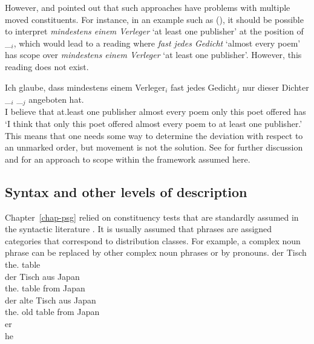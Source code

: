 \noindent
However, \citet[]{Kiss2001a} and \citet[Section~2.6]{Fanselow2001a} pointed out that such
approaches have problems with multiple moved constituents. For instance, in an example such as
(), it should be possible to interpret \emph{mindestens einem Verleger} `at least one
publisher' at the position of \_$_i$, which would lead to a reading where \emph{fast jedes Gedicht}
`almost every poem' has scope over \emph{mindestens einem Verleger} `at least one
publisher'. However, this reading does not exist.


\ea
\gll Ich glaube, dass mindestens einem Verleger$_i$ fast jedes Gedicht$_j$ nur dieser Dichter \_$_i$ \_$_j$ angeboten hat.\\
     I believe that at.least one publisher almost every poem only this poet {} {} offered has\\
\glt `I think that only this poet offered almost every poem to at least one publisher.'
\z
\noindent
This means that one needs some way to determine the deviation with respect to an unmarked order, but
movement is not the solution. See  for further discussion and
\citet{Kiss2001a} for an approach to scope within the framework assumed here.

\subsection{Syntax and other levels of description}
\label{sec-down-to-earth-syntax}

Chapter~\ref{chap-psg} relied on constituency tests that are standardly assumed in the syntactic
literature \parencites[24--31]{Borsley91a}[35--36]{Haegeman94a-u}[20--23]{HP2002a-ed}[29--33]{SWB2003a}[19--22]{KS2008a-u}[Chapter~1.3]{MuellerGT-Eng}{MyP2022a}.
It is usually assumed that phrases are assigned categories that correspond to distribution
classes. For example, a complex noun phrase can be replaced by other complex noun phrases or by
pronouns. 
\eal
\label{ex-np-tisch}
\ex 
\gll der Tisch\\
     the.\NOM{} table\\
\ex 
\gll der Tisch aus Japan\\
     the.\NOM{} table from Japan\\
\ex 
\gll der alte Tisch aus Japan\\
     the.\NOM{} old  table from Japan\\
\ex 
\gll er\\
     he\\
\zl

